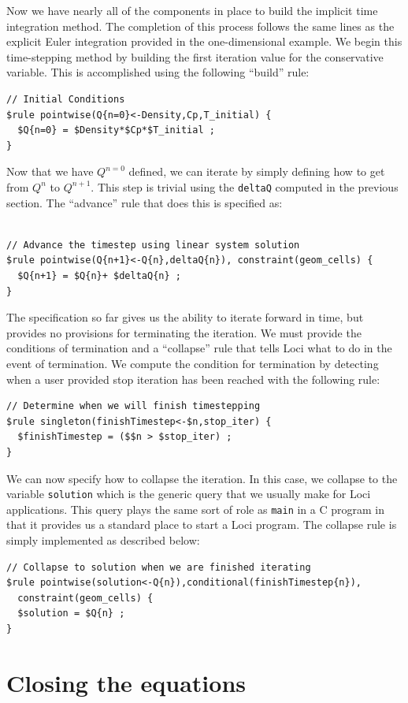 \documentclass[10pt,epsf,letterpaper,twoside]{book}
\begin{document}
Now we have nearly all of the components in place to build the
implicit time integration method.  The completion of this process
follows the same lines as the explicit Euler integration provided in
the one-dimensional example.  We begin this time-stepping method by
building the first iteration value for the conservative variable.
This is accomplished using the following ``build'' rule:
\begin{verbatim}
// Initial Conditions
$rule pointwise(Q{n=0}<-Density,Cp,T_initial) {
  $Q{n=0} = $Density*$Cp*$T_initial ;
}
\end{verbatim}
Now that we have $Q^{n=0}$ defined, we can iterate by simply defining
how to get from $Q^n$ to $Q^{n+1}$.  This step is trivial using the
{\tt deltaQ} computed in the previous section.  The ``advance'' rule
that does this is specified as:
\begin{verbatim}

// Advance the timestep using linear system solution
$rule pointwise(Q{n+1}<-Q{n},deltaQ{n}), constraint(geom_cells) {
  $Q{n+1} = $Q{n}+ $deltaQ{n} ;
}
\end{verbatim}

The specification so far gives us the ability to iterate forward in
time, but provides no provisions for terminating the iteration.  We
must provide the conditions of termination and a ``collapse'' rule
that tells Loci what to do in the event of termination.  We compute
the condition for termination by detecting when a user provided stop
iteration has been reached with the following rule:
\begin{verbatim}
// Determine when we will finish timestepping
$rule singleton(finishTimestep<-$n,stop_iter) {
  $finishTimestep = ($$n > $stop_iter) ;
}
\end{verbatim}

We can now specify how to collapse the iteration.  In this case, we
collapse to the variable {\tt solution} which is the generic query
that we usually make for Loci applications.  This query plays the same
sort of role as {\tt main} in a C program in that it provides us a
standard place to start a Loci program.  The collapse rule is simply
implemented as described below:
\begin{verbatim}
// Collapse to solution when we are finished iterating
$rule pointwise(solution<-Q{n}),conditional(finishTimestep{n}),
  constraint(geom_cells) {
  $solution = $Q{n} ;
}
\end{verbatim}

\section{Closing the equations}
\end{document}
